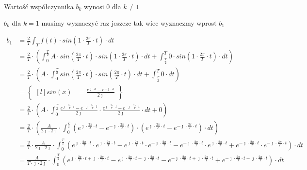 \begin{task}
Wartość współczynnika $b_k$ wynosi $0$ dla $k\neq 1$

$b_k$ dla $k=1$ musimy wyznaczyć raz jeszcze tak wiec wyznaczmy wprost $b_1$

\begin{align*}
b_1&=\frac{2}{T}\int_{T}f(t) \cdot sin\left( 1 \cdot \frac{2\pi}{T} \cdot t\right) \cdot dt\\
&=\frac{2}{T}\cdot\left(\int_{0}^{\frac{T}{2}}A \cdot sin\left( \frac{2\pi}{T} \cdot t\right) \cdot sin\left( 1 \cdot \frac{2\pi}{T} \cdot t\right) \cdot dt+\int_{\frac{T}{2}}^{T} 0 \cdot sin\left( 1 \cdot \frac{2\pi}{T} \cdot t\right) \cdot dt\right)\\
&=\frac{2}{T}\cdot\left(A \cdot \int_{0}^{\frac{T}{2}}sin\left( \frac{2\pi}{T} \cdot t\right) \cdot sin\left( \frac{2\pi}{T} \cdot t\right) \cdot dt+\int_{\frac{T}{2}}^{T} 0 \cdot dt\right)\\
&=\begin{Bmatrix*}[l]
sin\left(x\right)&=\frac{e^{\jmath \cdot x}-e^{-\jmath \cdot x}}{2 \jmath }
\end{Bmatrix*}\\
&=\frac{2}{T}\cdot\left(A \cdot \int_{0}^{\frac{T}{2}} \frac{e^{\jmath \cdot \frac{2\pi}{T} \cdot t}-e^{-\jmath \cdot \frac{2\pi}{T} \cdot t}}{2\jmath} \cdot \frac{e^{\jmath \cdot \frac{2\pi}{T} \cdot t}-e^{-\jmath \cdot \frac{2\pi}{T} \cdot t}}{2\jmath} \cdot dt+0\right)\\
&=\frac{2}{T}\cdot\left(\frac{A}{2\jmath\cdot 2\jmath} \cdot \int_{0}^{\frac{T}{2}} \left(e^{\jmath \cdot \frac{2\pi}{T} \cdot t}-e^{-\jmath \cdot \frac{2\pi}{T} \cdot t}\right)\cdot \left(e^{\jmath \cdot \frac{2\pi}{T} \cdot t}-e^{-\jmath \cdot \frac{2\pi}{T} \cdot t}\right) \cdot dt\right)\\
&=\frac{2}{T} \cdot \frac{A}{2\jmath\cdot 2\jmath} \cdot \int_{0}^{\frac{T}{2}} \left(e^{\jmath \cdot \frac{2\pi}{T} \cdot t} \cdot e^{\jmath \cdot \frac{2\pi}{T} \cdot t} - e^{\jmath \cdot \frac{2\pi}{T} \cdot t} \cdot e^{-\jmath \cdot \frac{2\pi}{T} \cdot t} - e^{-\jmath \cdot \frac{2\pi}{T} \cdot t} \cdot e^{\jmath \cdot \frac{2\pi}{T} \cdot t} + e^{-\jmath \cdot \frac{2\pi}{T} \cdot t} \cdot e^{-\jmath \cdot \frac{2\pi}{T} \cdot t} \right) \cdot dt\\
&=\frac{A}{T\cdot \jmath \cdot 2\jmath} \cdot \int_{0}^{\frac{T}{2}} \left(e^{\jmath \cdot \frac{2\pi}{T} \cdot t + \jmath \cdot \frac{2\pi}{T} \cdot t} - e^{\jmath \cdot \frac{2\pi}{T} \cdot t -\jmath \cdot \frac{2\pi}{T} \cdot t} - e^{-\jmath \cdot \frac{2\pi}{T} \cdot t+ \jmath \cdot \frac{2\pi}{T} \cdot t} + e^{-\jmath \cdot \frac{2\pi}{T} \cdot t -\jmath \cdot \frac{2\pi}{T} \cdot t} \right) \cdot dt\\

\end{align*}
\end{task}
